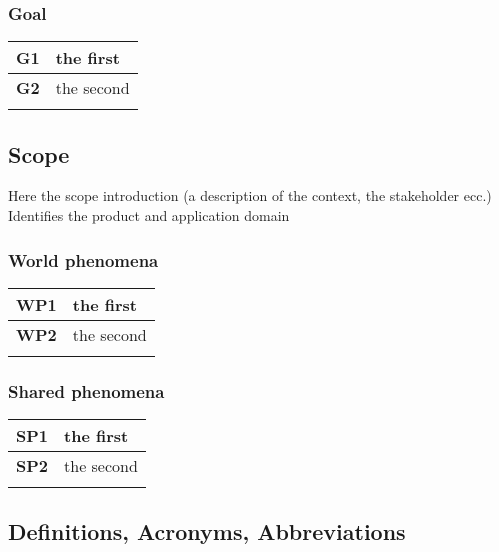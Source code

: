 \subsubsection*{Goal}
\begin{table}[h]
    \begin{tabular}{|l|l|}
        \toprule
        \textbf{G1} & the first  \\ \midrule
        \textbf{G2} & the second \\ \midrule
                    &            \\ \bottomrule
    \end{tabular}
\end{table}

\subsection{Scope}
Here the scope introduction (a description of the context, the stakeholder ecc.)
Identifies the product and application domain
\subsubsection*{World phenomena}
\begin{table}[h]
    \begin{tabular}{|l|l|}
        \toprule
        \textbf{WP1} & the first  \\ \midrule
        \textbf{WP2} & the second \\ \midrule
                     &            \\ \bottomrule
    \end{tabular}
\end{table}
\subsubsection*{Shared phenomena}
\begin{table}[h]
    \begin{tabular}{|l|l|}
        \toprule
        \textbf{SP1} & the first  \\ \midrule
        \textbf{SP2} & the second \\ \midrule
                     &            \\ \bottomrule
    \end{tabular}
\end{table}


\subsection{Definitions, Acronyms, Abbreviations}
